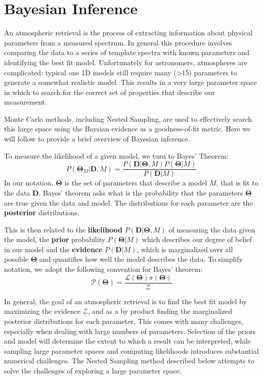 \section{Bayesian Inference}
An atmospheric retrieval is the process of extracting information about physical parameters from a measured spectrum. 
In general this procedure involves comparing the data to a series of template spectra with known parameters and identifying the best fit model.
Unfortunately for astronomers, atmospheres are complicated: typical one 1D models still require many (>15) parameters to generate a somewhat realistic model. 
This results in a very large parameter space in which to search for the correct set of properties that describe our measurement.

Monte Carlo methods, including Nested Sampling, are used to effectively search this large space using the Baysian evidence as a goodness-of-fit metric.
Here we will follow \parencite{Speagle2019} to provide a brief overview of Bayesian inference.

To measure the likelihood of a given model, we turn to Bayes' Theorem:
\begin{equation}\label{eqn:bayes}
P(\mathbf{\Theta}_{M}|\mathbf{D},M) = \frac{P(\mathbf{D}|\mathbf{\Theta},M)P(\mathbf{\Theta}|M)}{P(\mathbf{D}|M)}
\end{equation}
In our notation, $\mathbf{\Theta}$ is the set of parameters that describe a model $M$, that is fit to the data $\mathbf{D}$. 
Bayes' theorem asks what is the probability that the parameters $\mathbf{\Theta}$ are true given the data and model. 
The distributions for each parameter are the \textbf{posterior} distributions.

This is then related to the \textbf{likelihood} $P(\mathbf{D}|\mathbf{\Theta},M)$ of measuring the data given the model, the \textbf{prior} probability $P(\mathbf{\Theta}|M)$ which describes our degree of belief in our model and the \textbf{evidence} $P(\mathbf{D}|M)$, which is marginalized over all possible $\mathbf{\Theta}$ and quantifies how well the model describes the data.
To simplify notation, we adopt the following convention for Bayes' theorem:
\begin{equation}
\mathcal{P}(\mathbf{\Theta}) = \frac{\mathcal{L}(\mathbf{\Theta})\pi(\mathbf{\Theta})}{\mathcal{Z}}
\end{equation}

In general, the goal of an atmospheric retrieval is to find the best fit model by maximizing the evidence $\mathcal{Z}$, and as a by product finding the marginalized posterior distributions for each parameter.
This comes with many challenges, especially when dealing with large numbers of parameters.
Selection of the priors and model will determine the extent to which a result can be interpreted, while sampling large parameter spaces and computing likelihoods introduces substantial numerical challenges. 
The Nested Sampling method described below attempts to solve the challenges of exploring a large parameter space.


